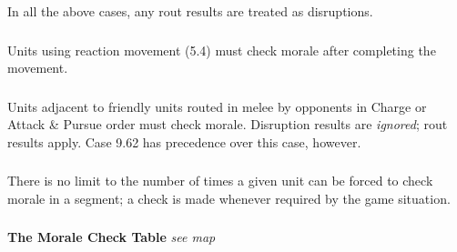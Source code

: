 In all the above cases, any rout results are treated as disruptions.

\subsubsection[Reaction Movement]{} Units using reaction movement (5.4) must check morale after completing the movement.

\subsubsection[Adjacent Units]{} Units adjacent to friendly units routed in melee by opponents in Charge or Attack \& Pursue order must check morale. Disruption results are \textit{ignored}; rout results apply. Case 9.62 has precedence over this case, however.

\subsubsection[No Limits]{} There is no limit to the number of times a given unit can be forced to check morale in a segment; a check is made whenever required by the game situation.

\subsubsection{} \textbf{The Morale Check Table} \textit{see map}